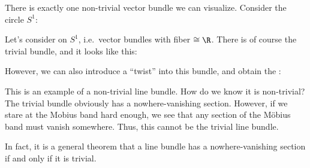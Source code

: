 \documentclass[a4paper]{article}
\begin{document}
\begin{eg}
  There is exactly one non-trivial vector bundle we can visualize. Consider the circle $S^1$:
  \begin{center}
  \end{center}
  Let's consider  on $S^1$, i.e.\ vector bundles with fiber $\cong \R$. There is of course the trivial bundle, and it looks like this:
  \begin{center}
  \end{center}
  However, we can also introduce a ``twist'' into this bundle, and obtain the :
  \begin{center}
  \end{center}
  This is an example of a non-trivial line bundle. How do we know it is non-trivial? The trivial bundle obviously has a nowhere-vanishing section. However, if we stare at the Mobius band hard enough, we see that any section of the M\"obius band must vanish somewhere. Thus, this cannot be the trivial line bundle.

  In fact, it is a general theorem that a line bundle has a nowhere-vanishing section if and only if it is trivial.
\end{eg}
\end{document}
